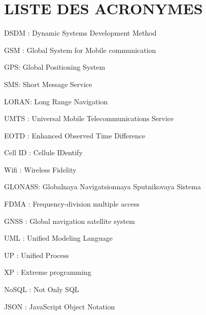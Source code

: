 \chapter*{LISTE DES ACRONYMES}
\noindent DSDM : Dynamic Systems Development Method

\noindent GSM : Global System for Mobile communication

\noindent GPS: Global Positioning System

\noindent SMS: Short Message Service

\noindent LORAN: Long Range Navigation

\noindent UMTS : Universal Mobile Telecommunications Service

\noindent EOTD : Enhanced Observed Time Difference

\noindent Cell ID : Cellule IDentify

\noindent Wifi : Wireless Fidelity

\noindent GLONASS: Globalnaya Navigatsionnaya Sputnikovaya Sistema

\noindent FDMA : Frequency-division multiple access

\noindent GNSS : Global navigation satellite system

\noindent UML : Unified Modeling Language

\noindent UP : Unified Process

\noindent XP : Extreme programming

\noindent NoSQL : Not Only SQL

\noindent JSON : JavaScript Object Notation
